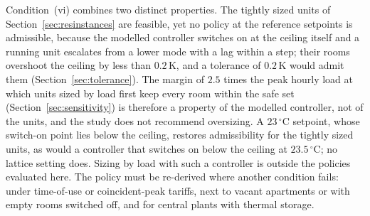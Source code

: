 \documentclass[10pt,a4paper,twocolumn]{article}
\theoremstyle{definition}
\newcommand{\hlRszMargin}{2.5}
\newcommand{\hlTightSp}{23}
\begin{document}
Condition~(vi) combines two distinct properties. The tightly sized units of Section~\ref{sec:resinstances} are feasible, yet no policy at the reference setpoints is admissible, because the modelled controller switches on at the ceiling itself and a running unit escalates from a lower mode with a lag within a step; their rooms overshoot the ceiling by less than $0.2\,$K, and a tolerance of $0.2\,$K would admit them (Section~\ref{sec:tolerance}). The margin of $\hlRszMargin$ times the peak hourly load at which units sized by load first keep every room within the safe set (Section~\ref{sec:sensitivity}) is therefore a property of the modelled controller, not of the units, and the study does not recommend oversizing. A $\hlTightSp\,^{\circ}$C setpoint, whose switch-on point lies below the ceiling, restores admissibility for the tightly sized units, as would a controller that switches on below the ceiling at $23.5\,^{\circ}$C; no lattice setting does. Sizing by load with such a controller is outside the policies evaluated here. The policy must be re-derived where another condition fails: under time-of-use or coincident-peak tariffs, next to vacant apartments or with empty rooms switched off, and for central plants with thermal storage.
\end{document}
